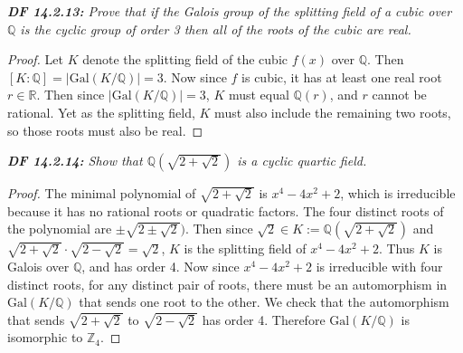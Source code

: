 \documentclass{article}
\begin{document}
\it \textbf{DF 14.2.13:} Prove that if the Galois group of the splitting
  field of a cubic over $\mathbb{Q}$ is the cyclic group of order 3 then
  all of the roots of the cubic are real.

  \begin{proof}
    Let $K$ denote the splitting field of the cubic $f(x)$ over
    $\mathbb{Q}$. Then $[K:\mathbb{Q}]=|\text{Gal}(K/\mathbb{Q})|=3$. Now
    since $f$ is cubic, it has at least one real root $r\in\mathbb{R}$.
    Then since $|\text{Gal}(K/\mathbb{Q})|=3$, $K$ must equal
    $\mathbb{Q}(r)$, and $r$ cannot be rational. Yet as the splitting
    field, $K$ must also include the remaining two roots, so those roots
    must also be real.
  \end{proof}

\it \textbf{DF 14.2.14:} Show that $\mathbb{Q}(\sqrt{2+\sqrt{2}})$ is a
  cyclic quartic field.

  \begin{proof}
    The minimal polynomial of $\sqrt{2+\sqrt{2}}$ is $x^4-4x^2+2$, which is
    irreducible because it has no rational roots or quadratic factors.  The
    four distinct roots of the polynomial are $\pm\sqrt{2\pm\sqrt{2}})$.
    Then since $\sqrt{2}\in K:=\mathbb{Q}(\sqrt{2+\sqrt{2}})$ and
    $\sqrt{2+\sqrt{2}} \cdot\sqrt{2-\sqrt{2}}=\sqrt{2}$, $K$ is the
    splitting field of $x^4-4x^2+2$. Thus $K$ is Galois over $\mathbb{Q}$,
    and has order 4. Now since $x^4-4x^2+2$ is irreducible with four
    distinct roots, for any distinct pair of roots, there must be an
    automorphism in $\text{Gal}(K/\mathbb{Q})$ that sends one root to the
    other. We check that the automorphism that sends $\sqrt{2+\sqrt{2}}$ to
    $\sqrt{2-\sqrt{2}}$ has order 4. Therefore $\text{Gal}(K/\mathbb{Q})$
    is isomorphic to $\mathbb{Z}_4$.
  \end{proof}
\end{document}
